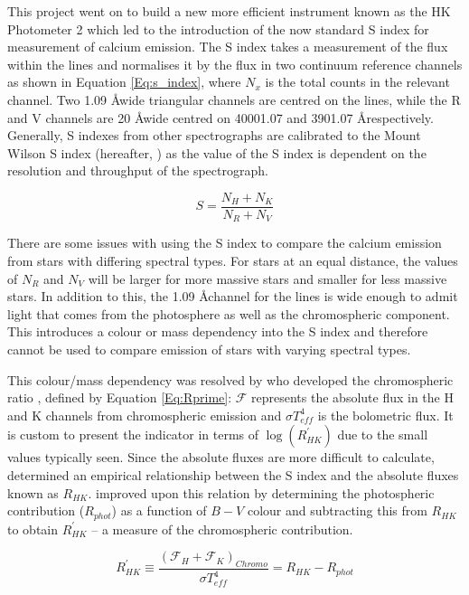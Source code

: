 This project went on to build a new more efficient instrument known as the HK Photometer 2 \citep{Vaughan_etal_1978} which led to the introduction of the now standard S index for measurement of calcium emission. The S index takes a measurement of the flux within the \caII lines and normalises it by the flux in two continuum reference channels as shown in Equation \ref{Eq:s_index}, where $N_{x}$ is the total counts in the relevant channel. Two 1.09 \AA \space wide triangular channels are centred on the \caII lines, while the R and V channels are 20 \AA \space wide centred on 40001.07 and 3901.07 \AA \space respectively. Generally, S indexes from other spectrographs are calibrated to the Mount Wilson S index (hereafter, \Smw) as the value of the S index is dependent on the resolution and throughput of the spectrograph.

\begin{equation}
    S = \frac{N_{H} + N_{K}}{N_{R} + N_{V}}
    \label{Eq:s_index}
\end{equation}

There are some issues with using the S index to compare the calcium emission from stars with differing spectral types. For stars at an equal distance, the values of $N_{R}$ and $N_{V}$ will be larger for more massive stars and smaller for less massive stars. In addition to this, the 1.09 \AA \space channel for the \caII lines is wide enough to admit light that comes from the photosphere as well as the chromospheric component. This introduces a colour or mass dependency into the S index and therefore cannot be used to compare emission of stars with varying spectral types.

This colour/mass dependency was resolved by \citet{Noyes_etal_1984} who developed the chromospheric ratio \Rprime, defined by Equation \ref{Eq:Rprime}: $\mathcal{F}$ represents the absolute flux in the H and K channels from chromospheric emission and $\sigma T_{eff}^{4}$ is the bolometric flux. It is custom to present the \Rprime indicator in terms of $\log(R^{'}_{HK})$ due to the small values typically seen. Since the absolute fluxes are more difficult to calculate, \citet{Middelkoop_1982} determined an empirical relationship between the S index and the absolute fluxes known as $R_{HK}$. \citet{Noyes_etal_1984} improved upon this relation by determining the photospheric contribution ($R_{phot}$) as a function of $B-V$ colour and subtracting this from $R_{HK}$ to obtain $R^{'}_{HK}$ -- a measure of the chromospheric contribution.

\begin{equation}
    R^{'}_{HK} \equiv \frac{(\mathcal{F}_{H} + \mathcal{F}_{K})_{Chromo}}{\sigma T_{eff}^{4}} = R_{HK} - R_{phot}
    \label{Eq:Rprime}
\end{equation}

